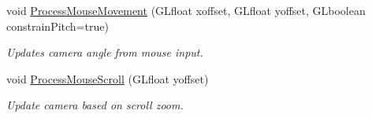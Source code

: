 \begin{DoxyCompactItemize}
void \hyperlink{class_camera_a97ffbf8d8935fc63bd2ca71a4268eec4}{Process\+Mouse\+Movement} (G\+Lfloat xoffset, G\+Lfloat yoffset, G\+Lboolean constrain\+Pitch=true)
\begin{DoxyCompactList}\small\item\em Updates camera angle from mouse input. \end{DoxyCompactList}\item 
\hypertarget{class_camera_af269e5ef38e791afb7f4a1dfb8da2399}{}\label{class_camera_af269e5ef38e791afb7f4a1dfb8da2399} 
void \hyperlink{class_camera_af269e5ef38e791afb7f4a1dfb8da2399}{Process\+Mouse\+Scroll} (G\+Lfloat yoffset)
\begin{DoxyCompactList}\small\item\em Update camera based on scroll zoom. \end{DoxyCompactList}\end{DoxyCompactItemize}
